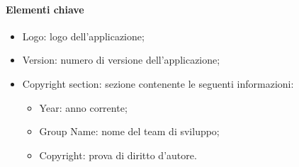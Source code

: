 \paragraph*{Elementi chiave}
\begin{itemize}
  \item Logo: logo dell'applicazione;
  \item Version: numero di versione dell'applicazione;
  \item Copyright section: sezione contenente le seguenti informazioni:
  \begin{itemize}
    \item Year: anno corrente;
    \item Group Name: nome del team di sviluppo;
    \item Copyright: prova di diritto d'autore.
  \end{itemize}
\end{itemize}